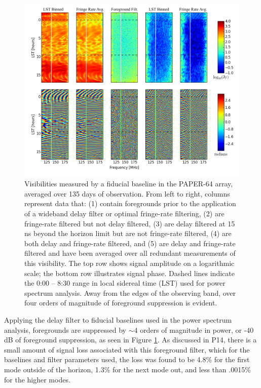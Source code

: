 \documentclass[twocolumn,numberedappendix]{emulateapj} \shorttitle{PSA64}
\begin{document}
\begin{figure}
\centering
\includegraphics[width=2\columnwidth]{plots/waterfalls_labeled.png}
\caption{
Visibilities measured by a fiducial baseline in the PAPER-64 array, 
averaged over 135 days of observation.  From left to right, columns represent
data that: (1) contain foregrounds prior to the application of a wideband
delay filter or optimal fringe-rate filtering, (2) are fringe-rate filtered but
not delay filtered, (3) are delay filtered at 15 ns beyond the horizon limit but
are not fringe-rate filtered, (4) are both delay and fringe-rate filtered,
and (5) are delay and fringe-rate filtered and have been averaged over all
redundant measurements of this visibility.  The top row shows signal amplitude
on a logarithmic scale; the bottom row illustrates signal phase.
Dashed lines indicate the 0:00 -- 8:30 range in local sidereal time (LST) used for power
spectrum analysis.  Away from the edges of the observing band, over four orders 
of magnitude of foreground suppression is evident.
} \label{fig:waterfalls}
\end{figure}

Applying the delay filter to fiducial baselines used in the power spectrum analysis,
foregrounds are suppressed by $\sim$4 orders of magnitude in power, or
 -40 dB of foreground suppression, as seen in Figure
\ref{fig:waterfalls}. As discussed in P14, there is a small amount of signal loss
associated with this foreground filter, which for the baselines and filter parameters used, the loss was found to be 4.8\% for the
first mode outside of the horizon, 1.3\% for the next mode out, and less than
.0015\% for the higher modes.  
\end{document}
